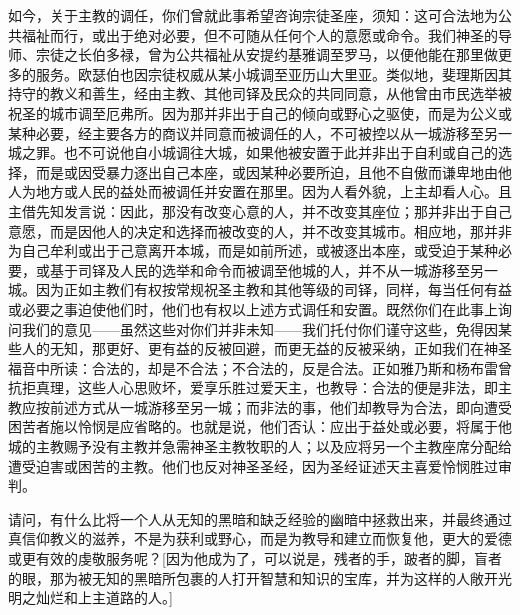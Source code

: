 如今，关于主教的调任，你们曾就此事希望咨询宗徒圣座，须知：这可合法地为公共福祉而行，或出于绝对必要，但不可随从任何个人的意愿或命令。我们神圣的导师、宗徒之长伯多禄，曾为公共福祉从安提约基雅调至罗马，以便他能在那里做更多的服务。欧瑟伯也因宗徒权威从某小城调至亚历山大里亚。类似地，斐理斯因其持守的教义和善生，经由主教、其他司铎及民众的共同同意，从他曾由市民选举被祝圣的城市调至厄弗所。因为那并非出于自己的倾向或野心之驱使，而是为公义或某种必要，经主要各方的商议并同意而被调任的人，不可被控以从一城游移至另一城之罪。也不可说他自小城调往大城，如果他被安置于此并非出于自利或自己的选择，而是或因受暴力逐出自己本座，或因某种必要所迫，且他不自傲而谦卑地由他人为地方或人民的益处而被调任并安置在那里。因为人看外貌，上主却看人心。且主借先知发言说：因此，那没有改变心意的人，并不改变其座位；那并非出于自己意愿，而是因他人的决定和选择而被改变的人，并不改变其城市。相应地，那并非为自己牟利或出于己意离开本城，而是如前所述，或被逐出本座，或受迫于某种必要，或基于司铎及人民的选举和命令而被调至他城的人，并不从一城游移至另一城。因为正如主教们有权按常规祝圣主教和其他等级的司铎，同样，每当任何有益或必要之事迫使他们时，他们也有权以上述方式调任和安置。既然你们在此事上询问我们的意见——虽然这些对你们并非未知——我们托付你们谨守这些，免得因某些人的无知，那更好、更有益的反被回避，而更无益的反被采纳，正如我们在神圣福音中所读：合法的，却是不合法；不合法的，反是合法。正如雅乃斯和杨布雷曾抗拒真理，这些人心思败坏，爱享乐胜过爱天主，也教导：合法的便是非法，即主教应按前述方式从一城游移至另一城；而非法的事，他们却教导为合法，即向遭受困苦者施以怜悯是应省略的。也就是说，他们否认：应出于益处或必要，将属于他城的主教赐予没有主教并急需神圣主教牧职的人；以及应将另一个主教座席分配给遭受迫害或困苦的主教。他们也反对神圣圣经，因为圣经证述天主喜爱怜悯胜过审判。\par

请问，有什么比将一个人从无知的黑暗和缺乏经验的幽暗中拯救出来，并最终通过真信仰教义的滋养，不是为获利或野心，而是为教导和建立而恢复他，更大的爱德或更有效的虔敬服务呢？[因为他成为了，可以说是，残者的手，跛者的脚，盲者的眼，那为被无知的黑暗所包裹的人打开智慧和知识的宝库，并为这样的人敞开光明之灿烂和上主道路的人。]\par

